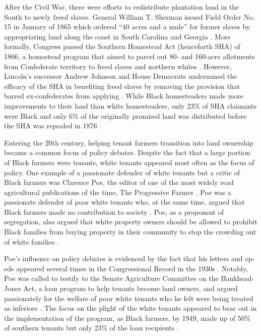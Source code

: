 \documentclass[12pt]{article}
\begin{document}
After the Civil War, there were efforts to redistribute plantation land in the South to newly freed slaves. 
General William T. Sherman issued Field Order No. 15 in January of 1865 which ordered “40 acres and a mule” for former slaves by appropriating land along the coast in South Carolina and Georgia \citep{special_field_orders_no_15_order_1865}. 
More formally, Congress passed the Southern Homestead Act (henceforth SHA) of 1866, a homestead program that aimed to parcel out 80- and 160-acre allotments from Confederate territory to freed slaves and northern whites \citep{williams_shanks_homestead_2000}. 
However, Lincoln's successor Andrew Johnson and House Democrats undermined the efficacy of the SHA in benefiting freed slaves by removing the provision that barred ex-confederates from applying \citep{williams_shanks_homestead_2000}.
While Black homesteaders made more improvements to their land than white homesteaders, only 23\% of SHA claimants were Black and only 6\% of the originally promised land was distributed before the SHA was repealed in 1876 \citep{canaday_race_2015,lanza_agrarianism_1999}.

Entering the 20th century, helping tenant farmers transition into land ownership became a common focus of policy debates.
Despite the fact that a large portion of Black farmers were tenants, white tenants appeared most often as the focus of policy.
One example of a passionate defender of white tenants but a critic of Black farmers was Clarence Poe, the editor of one of the most widely read agricultural publications of the time, The Progressive Farmer \citep{cote_clarence_1979}. 
Poe was a passionate defender of poor white tenants who, at the same time, argued that Black farmers made no contribution to society \citep{poe_what_1915}. Poe, as a proponent of segregation, also argued that white property owners should be allowed to prohibit Black families from buying property in their community to stop the crowding out of white families \citep{poe_south-wide_1913}. 

Poe’s influence on policy debates is evidenced by the fact that his letters and op-eds appeared several times in the Congressional Record in the 1930s \citep{78_cong_rec_5476_congressional_1934,79_cong_rec_685_congressional_1935}. 
Notably, Poe was called to testify to the Senate Agriculture Committee on the Bankhead-Jones Act, a loan program to help tenants become land owners, and argued passionately for the welfare of poor white tenants who he felt were being treated as inferiors \citep{75th_cong_355_farm_1937}. 
The focus on the plight of the white tenants appeared to bear out in the implementation of the program, as Black farmers, by 1949, made up of 50\% of southern tenants but only 23\% of the loan recipients \citep{banfield_ten_1949}. 
\end{document}
